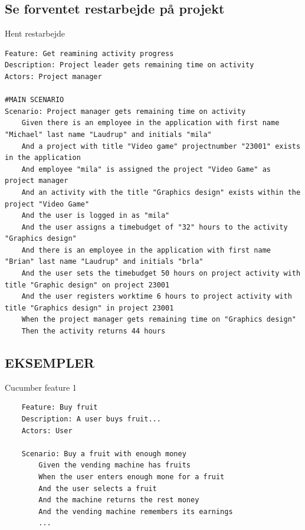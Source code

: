 \subsection{Se forventet restarbejde på projekt}
\begin{listing}[H]
    \centering
    \caption{Hent restarbejde}\label{lst:remainingTime}
    \begin{verbatim}
Feature: Get reamining activity progress
Description: Project leader gets remaining time on activity
Actors: Project manager

#MAIN SCENARIO
Scenario: Project manager gets remaining time on activity
    Given there is an employee in the application with first name "Michael" last name "Laudrup" and initials "mila"
    And a project with title "Video game" projectnumber "23001" exists in the application
    And employee "mila" is assigned the project "Video Game" as project manager
    And an activity with the title "Graphics design" exists within the project "Video Game"
    And the user is logged in as "mila"
    And the user assigns a timebudget of "32" hours to the activity "Graphics design"
    And there is an employee in the application with first name "Brian" last name "Laudrup" and initials "brla"
    And the user sets the timebudget 50 hours on project activity with title "Graphic design" on project 23001
    And the user registers worktime 6 hours to project activity with title "Graphics design" in project 23001
    When the project manager gets remaining time on "Graphics design"
    Then the activity returns 44 hours
    \end{verbatim}
\end{listing}
\subsection{EKSEMPLER}

\begin{listing}[H]
    \centering
    \caption{Cucumber feature 1}\label{lst:feature1}
    \begin{verbatim}
    Feature: Buy fruit
    Description: A user buys fruit...
    Actors: User
        
    Scenario: Buy a fruit with enough money
        Given the vending machine has fruits
        When the user enters enough mone for a fruit
        And the user selects a fruit
        And the machine returns the rest money
        And the vending machine remembers its earnings
        ...
    \end{verbatim}
\end{listing}

